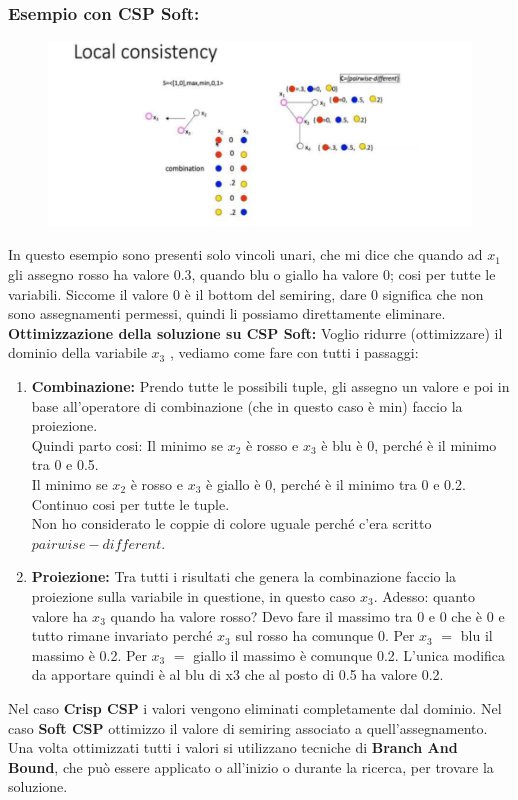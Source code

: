 \subsubsection{Esempio con CSP Soft:}
\begin{figure}[H]
    \centering
    \includegraphics[width=14cm, keepaspectratio]{img/Cap5/LocalConsistency.png}
\end{figure}
\noindent In questo esempio sono presenti solo vincoli unari, che mi dice che quando ad $x_1$ gli assegno rosso ha valore 0.3, quando blu o giallo ha valore 0; cosi per tutte le variabili. Siccome il valore 0 è il bottom del semiring, dare 0 significa che non sono assegnamenti permessi, quindi li possiamo direttamente eliminare.\\
\textbf{Ottimizzazione della soluzione su CSP Soft: } Voglio ridurre (ottimizzare) il dominio della variabile $x_3$ , vediamo come fare con tutti i passaggi:
\begin{enumerate}
    \item \textbf{Combinazione:} Prendo tutte le possibili tuple, gli assegno un valore e poi in base all'operatore di combinazione (che in questo caso è min) faccio la proiezione.
          \\Quindi parto cosi:
          Il minimo se $x_2$ è rosso e $x_3$ è blu è 0, perché è il minimo tra 0 e 0.5.
          \\Il minimo se $x_2$ è rosso e $x_3$ è giallo è 0, perché è il minimo tra 0 e 0.2.
          \\Continuo cosi per tutte le tuple.
          \\Non ho considerato le coppie di colore uguale perché c'era scritto $pairwise-different$.
    \item \textbf{Proiezione:} Tra tutti i risultati che genera la combinazione faccio la proiezione sulla variabile in questione, in questo caso $x_3$. Adesso: quanto valore ha $x_3$ quando ha valore rosso? Devo fare il massimo tra 0 e 0 che è 0 e tutto rimane invariato perché $x_3$ sul rosso ha comunque 0. Per $x_3$ $=$ blu il massimo è 0.2. Per $x_3$ $=$ giallo il massimo è comunque 0.2. L'unica modifica da apportare quindi è al blu di x3 che al posto di 0.5 ha valore 0.2.
\end{enumerate}
Nel caso \textbf{Crisp CSP} i valori vengono eliminati completamente dal dominio. Nel caso \textbf{Soft CSP} ottimizzo il valore di semiring associato a quell'assegnamento. Una volta ottimizzati tutti i valori si utilizzano tecniche di \textbf{Branch And Bound}, che può essere applicato o all'inizio o durante la ricerca, per trovare la soluzione.

